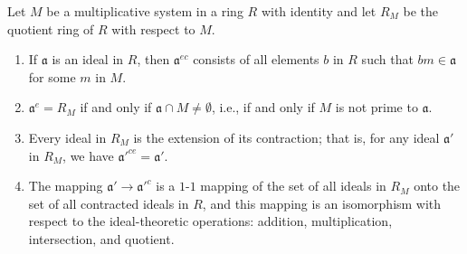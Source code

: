 Let $M$ be a multiplicative system in a ring $R$ with identity and let $R_M$ be the quotient ring of $R$ with respect to $M$.

\begin{enumerate}
\item[(a)] If $\mathfrak{a}$ is an ideal in $R$, then $\mathfrak{a}^{ec}$ consists of all elements $b$ in $R$ such that $bm \in \mathfrak{a}$ for some $m$ in $M$.

\item[(b)] $\mathfrak{a}^e = R_M$ if and only if $\mathfrak{a} \cap M \neq \emptyset$, i.e., if and only if $M$ is not prime to $\mathfrak{a}$.

\item[(c)] Every ideal in $R_M$ is the extension of its contraction; that is, for any ideal $\mathfrak{a}'$ in $R_M$, we have $\mathfrak{a}'^{ce} = \mathfrak{a}'$.

\item[(d)] The mapping $\mathfrak{a}' \to \mathfrak{a}'^{c}$ is a $1$-$1$ mapping of the set of all ideals in $R_M$ onto the set of all contracted ideals in $R$, and this mapping is an isomorphism with respect to the ideal-theoretic operations: addition, multiplication, intersection, and quotient.
\end{enumerate}
